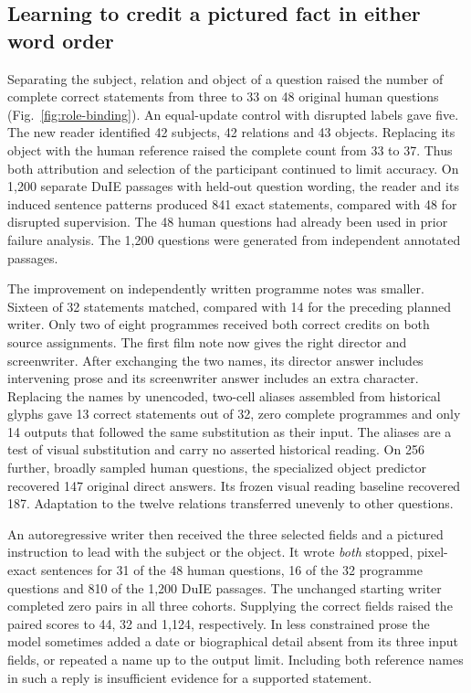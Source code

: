 \documentclass[12pt,a4paper]{article}
\providecommand{\DIFadd}[1]{{\protect\color{blue} \sf #1}} %
\begin{document}
\subsection*{\DIFadd{Learning to credit a pictured fact in either word order}}
\DIFadd{Separating the subject, relation and object of a question raised the number of complete correct statements from three to 33 on 48 original human questions (Fig.~\ref{fig:role-binding}). An equal-update control with disrupted labels gave five. The new reader identified 42 subjects, 42 relations and 43 objects. Replacing its object with the human reference raised the complete count from 33 to 37. Thus both attribution and selection of the participant continued to limit accuracy. On 1,200 separate DuIE passages with held-out question wording, the reader and its induced sentence patterns produced 841 exact statements, compared with 48 for disrupted supervision. The 48 human questions had already been used in prior failure analysis. The 1,200 questions were generated from independent annotated passages.
}

\DIFadd{The improvement on independently written programme notes was smaller. Sixteen of 32 statements matched, compared with 14 for the preceding planned writer. Only two of eight programmes received both correct credits on both source assignments. The first film note now gives the right director and screenwriter. After exchanging the two names, its director answer includes intervening prose and its screenwriter answer includes an extra character. Replacing the names by unencoded, two-cell aliases assembled from historical glyphs gave 13 correct statements out of 32, zero complete programmes and only 14 outputs that followed the same substitution as their input. The aliases are a test of visual substitution and carry no asserted historical reading. On 256 further, broadly sampled human questions, the specialized object predictor recovered 147 original direct answers. Its frozen visual reading baseline recovered 187. Adaptation to the twelve relations transferred unevenly to other questions.
}

\DIFadd{An autoregressive writer then received the three selected fields and a pictured instruction to lead with the subject or the object. It wrote \emph{both} stopped, pixel-exact sentences for 31 of the 48 human questions, 16 of the 32 programme questions and 810 of the 1,200 DuIE passages. The unchanged starting writer completed zero pairs in all three cohorts. Supplying the correct fields raised the paired scores to 44, 32 and 1,124, respectively. In less constrained prose the model sometimes added a date or biographical detail absent from its three input fields, or repeated a name up to the output limit. Including both reference names in such a reply is insufficient evidence for a supported statement.
}
\end{document}

